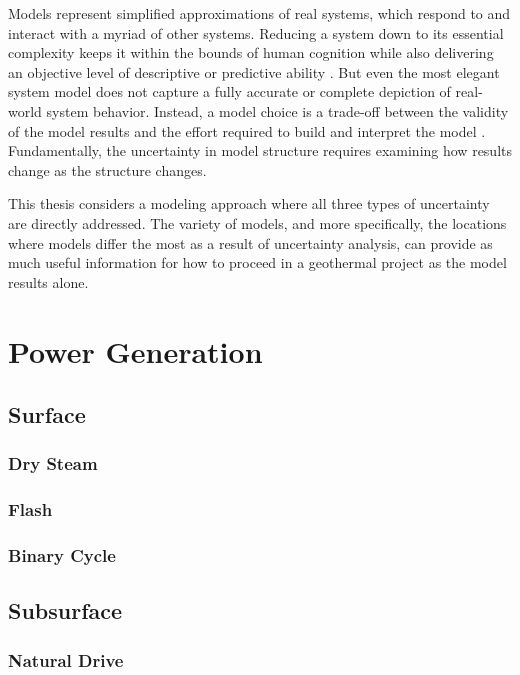 Models represent simplified approximations of real systems, which respond to and interact with a myriad of other systems. Reducing a system down to its essential complexity keeps it within the bounds of human cognition while also delivering an objective level of descriptive or predictive ability \citep[p.\ 306]{crawley_system_2015}. But even the most elegant system model does not capture a fully accurate or complete depiction of real-world system behavior. Instead, a model choice is a trade-off between the validity of the model results and the effort required to build and interpret the model \citep[p.\ 23]{morgan_best_2009}. Fundamentally, the uncertainty in model structure requires examining how results change as the structure changes.

This thesis considers a modeling approach where all three types of uncertainty are directly addressed. The variety of models, and more specifically, the locations where models differ the most as a result of uncertainty analysis, can provide as much useful information for how to proceed in a geothermal project as the model results alone.

\section{Power Generation}\label{ch2:elec}

\subsection{Surface}

\subsubsection{Dry Steam}

\subsubsection{Flash}

\subsubsection{Binary Cycle}

\subsection{Subsurface}

\subsubsection{Natural Drive}

